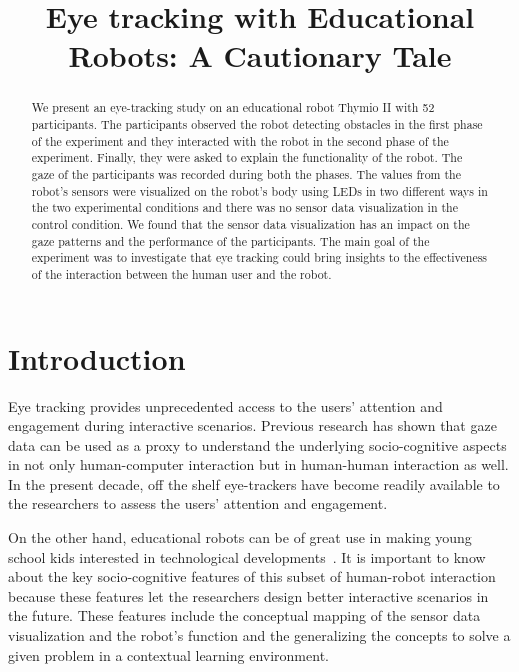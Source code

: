 \documentclass{sig-alternate}
\title{\LARGE \bf
    Eye tracking with Educational Robots: A Cautionary Tale
}
\begin{document}
\maketitle
\begin{abstract}

We present an eye-tracking study on an educational robot
Thymio II with 52 participants. The participants observed the robot
detecting obstacles in the first phase of the experiment and they
interacted with the robot in the second phase of the experiment.
Finally, they were asked to explain the functionality of the robot. The
gaze of the participants was recorded during both the phases. The values
from the robot's sensors were visualized on the robot's body using LEDs
in two different ways in the two experimental conditions and there was
no sensor data visualization in the control condition. We found that the
sensor data visualization has an impact on the gaze patterns and the
performance of the participants. The main goal of the experiment was to
investigate that eye tracking could bring insights to the effectiveness
of the interaction between the human user and the robot.

\end{abstract}
\section{Introduction}

Eye tracking provides unprecedented access to the users' attention and
engagement during interactive scenarios. Previous research has shown
that gaze data can be used as a proxy to understand the underlying
socio-cognitive aspects in not only human-computer interaction but in
human-human interaction as well. In the present decade, off the shelf
eye-trackers have become readily available to the researchers to assess
the users' attention and engagement.

On the other hand, educational robots can be of great use in making young school
kids interested in technological developments~\cite{cooper1999robots,
wyffels2010building}. It is important to know about the key socio-cognitive
features of this subset of human-robot interaction because these features let
the researchers design better interactive scenarios in the future. These
features include the conceptual mapping of the sensor data visualization and the
robot's function and the generalizing the concepts to solve a given problem in a
contextual learning environment. ~
\end{document}
